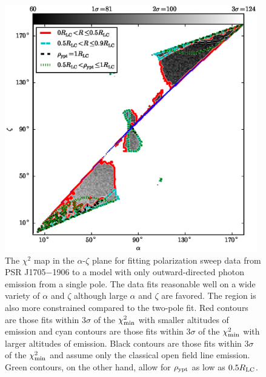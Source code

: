 \begin{figure}[t!!]
\begin{center}
\includegraphics[width=0.98\textwidth]{chapters/inwardDirectedPhotons/figures/mapB1702SinglePole.eps}
\caption[The $\chi^2$ map in the $\alpha$-$\zeta$ plane
for fitting polarization sweep data from PSR J1705$-$1906
to a model with only outward-directed photon emission
from a single pole]{
The $\chi^2$ map in the $\alpha$-$\zeta$ plane
for fitting polarization sweep data from PSR J1705$-$1906
to a model with only outward-directed photon emission
from a single pole.
The data fits reasonable well on a wide variety of
$\alpha$ and $\zeta$ although large $\alpha$ and $\zeta$
are favored.  The region is also more
constrained compared to the two-pole fit.
Red contours are those fits within
$3\sigma$ of the $\chi^2_{\rm{min}}$
with smaller altitudes of emission and
cyan contours are those fits within
$3\sigma$ of the $\chi^2_{\rm{min}}$ with larger
altitudes of emission.
Black contours are those fits within
$3\sigma$ of the $\chi^2_{\rm{min}}$
and assume only the classical
open field line emission.
Green contours, on the other hand, allow for
$\rho_{\rm{ypt}}$ as low as $0.5R_{\rm{LC}}$.
\label{fig:singlePole}
}
\end{center}
\end{figure}

